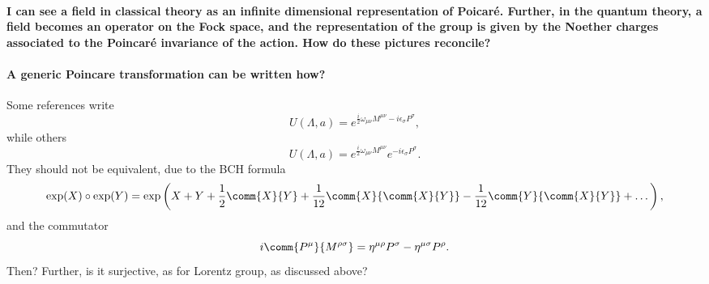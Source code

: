 \paragraph{I can see a field in classical theory as an infinite dimensional representation of Poicaré. Further, in the quantum theory, a field becomes an operator on the Fock space, and the representation of the group is given by the Noether charges associated to the Poincaré invariance of the action. How do these pictures reconcile?}

\paragraph{A generic Poincare transformation can be written how?}
Some references write 
\begin{equation}
    U(\Lambda,a) = e^{\frac{i}{2}\omega_{\mu\nu}M^{\mu\nu}-i\epsilon_{\sigma} P^{\sigma}},
\end{equation}
while others
\begin{equation}
    U(\Lambda,a) = e^{\frac{i}{2}\omega_{\mu\nu}M^{\mu\nu}}  e^{-i\epsilon_{\sigma} P^{\sigma}} .
\end{equation}
They should not  be equivalent, due to the BCH formula
\begin{equation}
    \exp(X) \circ \exp(Y) = \exp\left( X + Y + \frac{1}{2}\comm{X}{Y} + \frac{1}{12} \comm{X}{\comm{X}{Y}} - \frac{1}{12} \comm{Y}{\comm{X}{Y}} + \dots \right),
\end{equation}
and the commutator
\begin{equation}
    i \comm{P^\mu}{M^{\rho\sigma}} = \eta^{\mu\rho} P^\sigma - \eta^{\mu\sigma} P^\rho .
\end{equation}
Then? Further, is it surjective, as for Lorentz group, as discussed above?

\color{black}